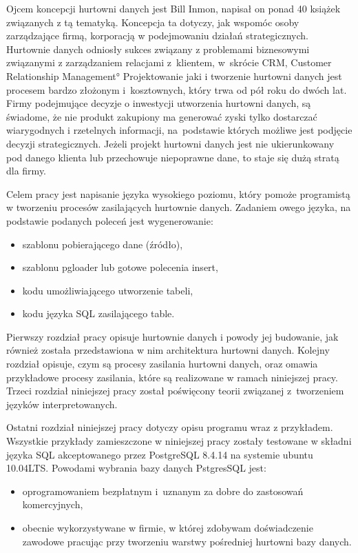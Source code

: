 
Ojcem koncepcji hurtowni danych jest Bill Inmon,
 napisał on ponad 40 książek związanych z tą tematyką.
Koncepcja ta dotyczy,
 jak wspomóc osoby zarządzające firmą,
 korporacją w podejmowaniu działań strategicznych.
Hurtownie danych odniosły sukces związany z problemami biznesowymi związanymi z zarządzaniem relacjami z~klientem,
 w~skrócie CRM, \ang{Customer Relationship Management}
Projektowanie jaki i tworzenie hurtowni danych jest procesem bardzo złożonym i~kosztownych,
 który trwa od pół roku do dwóch lat.
Firmy podejmujące decyzje o inwestycji utworzenia hurtowni danych,
 są świadome, 
 że nie produkt zakupiony ma generować zyski tylko dostarczać wiarygodnych i rzetelnych informacji, 
 na~podstawie których możliwe jest podjęcie decyzji strategicznych. 
Jeżeli projekt hurtowni danych jest nie ukierunkowany pod danego klienta lub przechowuje niepoprawne dane, 
 to staje się dużą stratą dla firmy.\cite{TodMan}

Celem pracy jest napisanie języka wysokiego poziomu, 
 który pomoże programistą w tworzeniu procesów zasilających hurtownie danych.
 Zadaniem owego języka, na podstawie podanych poleceń jest wygenerowanie:

\begin{itemize}
 \item szablonu pobierającego dane (źródło),
 \item szablonu pgloader lub gotowe polecenia insert,
 \item kodu umożliwiającego utworzenie tabeli,
 \item kodu języka SQL zasilającego table.
\end{itemize}


Pierwszy rozdział pracy opisuje hurtownie danych i powody jej budowanie,
 jak również  została przedstawiona w nim  architektura hurtowni danych.
Kolejny rozdział opisuje, czym są procesy zasilania hurtowni danych, 
 oraz omawia przykładowe procesy zasilania, które są realizowane w ramach niniejszej pracy.
Trzeci rozdział niniejszej pracy został poświęcony teorii związanej 
z~tworzeniem języków interpretowanych.

Ostatni rozdział niniejszej pracy dotyczy opisu programu wraz z przykładem.
 Wszystkie przykłady zamieszczone w niniejszej pracy zostały testowane 
w składni języka SQL akceptowanego 
przez PostgreSQL 8.4.14 na systemie ubuntu 10.04LTS.
Powodami wybrania bazy danych PstgresSQL jest:
\begin{itemize}
 \item oprogramowaniem bezpłatnym i~uznanym za dobre do zastosowań komercyjnych,
 \item obecnie wykorzystywane w firmie,
    w której zdobywam doświadczenie zawodowe pracując przy tworzeniu warstwy pośredniej hurtowni bazy danych.
\end{itemize}

